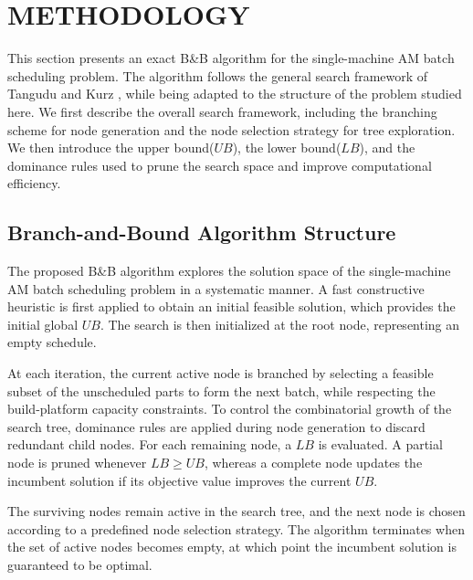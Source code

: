 \documentclass[letterpaper, 10 pt, conference]{ieeeconf}  %
\begin{document}
\section{METHODOLOGY}

This section presents an exact B\&B algorithm for the single-machine AM batch scheduling problem. The algorithm follows the general search framework of Tangudu and Kurz \cite{tanguduBranchBoundAlgorithm2006}, while being adapted to the structure of the problem studied here. We first describe the overall search framework, including the branching scheme for node generation and the node selection strategy for tree exploration. We then introduce the upper bound($UB$), the lower bound($LB$), and the dominance rules used to prune the search space and improve computational efficiency.

\subsection{Branch-and-Bound Algorithm Structure} 
The proposed B\&B algorithm explores the solution space of the single-machine AM batch scheduling problem in a systematic manner. A fast constructive heuristic is first applied to obtain an initial feasible solution, which provides the initial global $UB$. The search is then initialized at the root node, representing an empty schedule.

At each iteration, the current active node is branched by selecting a feasible subset of the unscheduled parts to form the next batch, while respecting the build-platform capacity constraints. To control the combinatorial growth of the search tree, dominance rules are applied during node generation to discard redundant child nodes. For each remaining node, a $LB$ is evaluated. A partial node is pruned whenever $LB \geq UB$, whereas a complete node updates the incumbent solution if its objective value improves the current $UB$.

The surviving nodes remain active in the search tree, and the next node is chosen according to a predefined node selection strategy. The algorithm terminates when the set of active nodes becomes empty, at which point the incumbent solution is guaranteed to be optimal.
\end{document}

